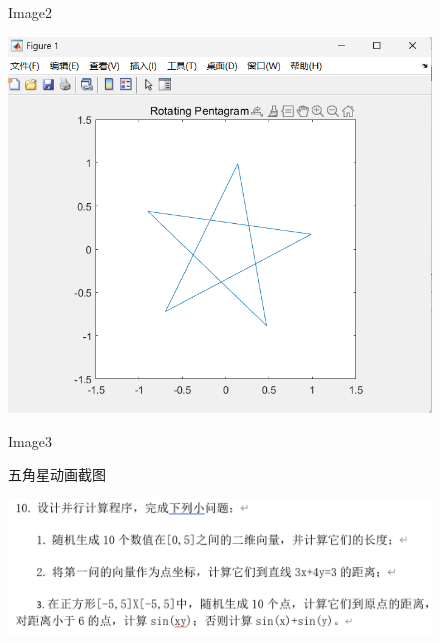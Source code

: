 \documentclass[12pt,UTF8]{ctexart}
\begin{document}
\begin{figure}[h]
\begin{minipage}{0.32\linewidth}
 
 
\centerline{Image2}
 
\end{minipage}
 
\begin{minipage}{0.32\linewidth}
 
\vspace{3pt}
 
\centerline{\includegraphics[width=\textwidth]{9.3.png}}
 
 
 
\centerline{Image3}
 
\end{minipage}
 
 
 
\caption{五角星动画截图 }
 
\label{fig4}
 
\end{figure}


\clearpage




\begin{figure}
    \centering
    \includegraphics[width=1\linewidth]{++10.png}
    
    
\end{figure}
\end{document}
